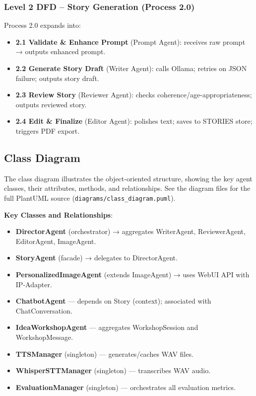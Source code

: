 \subsubsection{Level 2 DFD -- Story Generation (Process 2.0)}

Process 2.0 expands into:
\begin{itemize}
    \item \textbf{2.1 Validate \& Enhance Prompt} (Prompt Agent): receives raw prompt → outputs enhanced prompt.
    \item \textbf{2.2 Generate Story Draft} (Writer Agent): calls Ollama; retries on JSON failure; outputs story draft.
    \item \textbf{2.3 Review Story} (Reviewer Agent): checks coherence/age-appropriateness; outputs reviewed story.
    \item \textbf{2.4 Edit \& Finalize} (Editor Agent): polishes text; saves to STORIES store; triggers PDF export.
\end{itemize}

\subsection{Class Diagram}

The class diagram illustrates the object-oriented structure, showing the key agent classes, their attributes, methods, and relationships. See the diagram files for the full PlantUML source (\texttt{diagrams/class\_diagram.puml}).

\textbf{Key Classes and Relationships}:
\begin{itemize}
    \item \textbf{DirectorAgent} (orchestrator) → aggregates WriterAgent, ReviewerAgent, EditorAgent, ImageAgent.
    \item \textbf{StoryAgent} (facade) → delegates to DirectorAgent.
    \item \textbf{PersonalizedImageAgent} (extends ImageAgent) → uses WebUI API with IP-Adapter.
    \item \textbf{ChatbotAgent} — depends on Story (context); associated with ChatConversation.
    \item \textbf{IdeaWorkshopAgent} — aggregates WorkshopSession and WorkshopMessage.
    \item \textbf{TTSManager} (singleton) — generates/caches WAV files.
    \item \textbf{WhisperSTTManager} (singleton) — transcribes WAV audio.
    \item \textbf{EvaluationManager} (singleton) — orchestrates all evaluation metrics.

\end{itemize}

